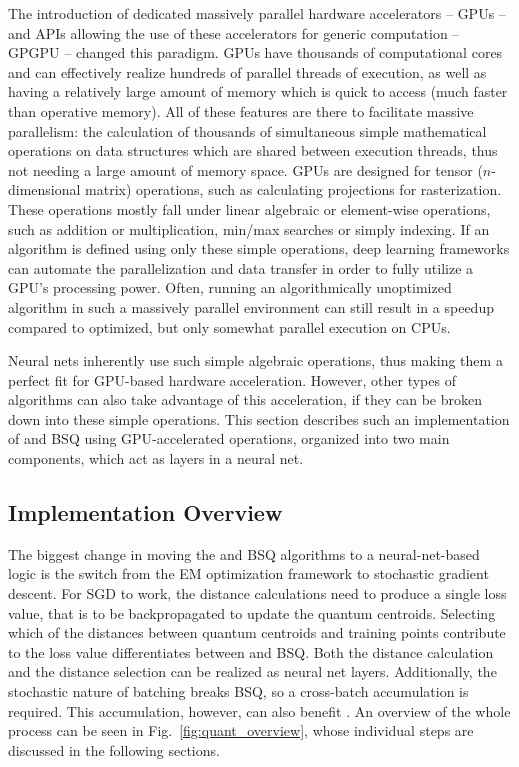 			The introduction of dedicated massively parallel hardware accelerators -- \acp{GPU} -- and \acp{API} allowing the use of these accelerators for generic computation -- \ac{GPGPU} -- changed this paradigm.
			\acp{GPU} have thousands of computational cores and can effectively realize hundreds of parallel threads of execution, as well as having a relatively large amount of memory which is quick to access (much faster than operative memory).
			All of these features are there to facilitate massive parallelism: the calculation of thousands of simultaneous simple mathematical operations on data structures which are shared between execution threads, thus not needing a large amount of memory space.
			\acp{GPU} are designed for tensor ($n$-dimensional matrix) operations, such as calculating projections for rasterization.
			These operations mostly fall under linear algebraic or element-wise operations, such as addition or multiplication, min/max searches or simply indexing.
			If an algorithm is defined using only these simple operations, deep learning frameworks can automate the parallelization and data transfer in order to fully utilize a \ac{GPU}'s processing power.
			Often, running an algorithmically unoptimized algorithm in such a massively parallel environment can still result in a speedup compared to optimized, but only somewhat parallel execution on \acp{CPU}.
			
			Neural nets inherently use such simple algebraic operations, thus making them a perfect fit for \ac{GPU}-based hardware acceleration.
			However, other types of algorithms can also take advantage of this acceleration, if they can be broken down into these simple operations.
			This section describes such an implementation of \kmeans{} and \ac{BSQ} using \ac{GPU}-accelerated operations, organized into two main components, which act as layers in a neural net.
			
		\subsection{Implementation Overview}
			
			The biggest change in moving the \kmeans{} and \ac{BSQ} algorithms to a neural-net-based logic is the switch from the \ac{EM} optimization framework to stochastic gradient descent.
			For \ac{SGD} to work, the distance calculations need to produce a single loss value, that is to be backpropagated to update the quantum centroids.
			Selecting which of the distances between quantum centroids and training points contribute to the loss value differentiates between \kmeans{} and \ac{BSQ}.
			Both the distance calculation and the distance selection can be realized as neural net layers.
			Additionally, the stochastic nature of batching breaks \ac{BSQ}, so a cross-batch accumulation is required.
			This accumulation, however, can also benefit \kmeans{}.
			An overview of the whole process can be seen in Fig.~\ref{fig:quant_overview}, whose individual steps are discussed in the following sections.
			
